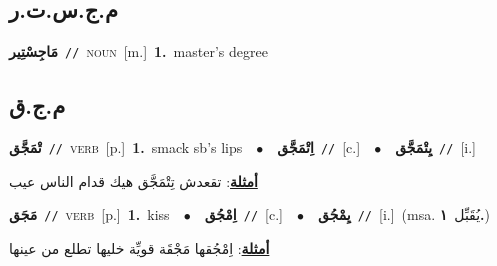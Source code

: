 \documentclass[10pt,a4paper,twoside]{article} %
\begin{document}
\begin{multicols}{2}
\vspace{-3mm}
\subsection*{\color{blue}\foreignlanguage{arabic}{م.ج.س.ت.ر}\color{blue}{ (ntws)}} 

{\setlength\topsep{0pt}\textbf{\foreignlanguage{arabic}{مَاجِسْتِير}}\ {\color{gray}\texttt{//}\color{black}}\ \textsc{noun}\ [m.]\ \textbf{1.}~master's degree\ } \vspace{2mm}

\vspace{-3mm}
\subsection*{\color{blue}\foreignlanguage{arabic}{م.ج.ق}\color{blue}{}} 

{\setlength\topsep{0pt}\textbf{\foreignlanguage{arabic}{تْمَجَّق}}\ {\color{gray}\texttt{//}\color{black}}\ \textsc{verb}\ [p.]\ \textbf{1.}~smack sb's lips\ \ $\bullet$\ \ \setlength\topsep{0pt}\textbf{\foreignlanguage{arabic}{اِتْمَجَّق}}\ {\color{gray}\texttt{//}\color{black}}\ [c.]\ \ $\bullet$\ \ \setlength\topsep{0pt}\textbf{\foreignlanguage{arabic}{يِتْمَجَّق}}\ {\color{gray}\texttt{//}\color{black}}\ [i.]\  \begin{flushright}\color{gray}\foreignlanguage{arabic}{\textbf{\underline{\foreignlanguage{arabic}{أمثلة}}}: تقعدش تِتْمَجَّق هيك قدام الناس عيب}\end{flushright}\color{black}} \vspace{2mm}

{\setlength\topsep{0pt}\textbf{\foreignlanguage{arabic}{مَجَق}}\ {\color{gray}\texttt{//}\color{black}}\ \textsc{verb}\ [p.]\ \textbf{1.}~kiss\ \ $\bullet$\ \ \setlength\topsep{0pt}\textbf{\foreignlanguage{arabic}{اِمْجُق}}\ {\color{gray}\texttt{//}\color{black}}\ [c.]\ \ $\bullet$\ \ \setlength\topsep{0pt}\textbf{\foreignlanguage{arabic}{يِمْجُق}}\ {\color{gray}\texttt{//}\color{black}}\ [i.]\ \color{gray}(msa. \foreignlanguage{arabic}{يُقَبِّل}~\foreignlanguage{arabic}{\textbf{١.}})\color{black}\  \begin{flushright}\color{gray}\foreignlanguage{arabic}{\textbf{\underline{\foreignlanguage{arabic}{أمثلة}}}: اِمْجُقها مَجْقَة قويِّة خليها تطلع من عينها}\end{flushright}\color{black}} \vspace{2mm}


\end{multicols}
\end{document}
